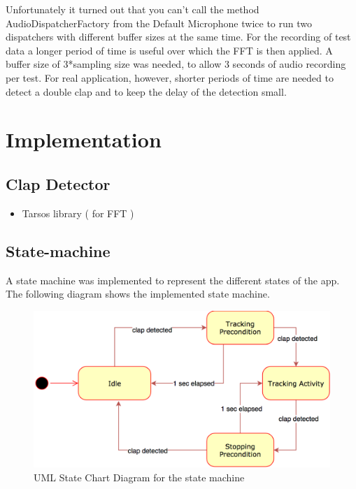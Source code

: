 Unfortunately it turned out that you can't call the method
AudioDispatcherFactory from the Default Microphone twice to run two dispatchers with
different buffer sizes at the same time. For the recording of test data a longer
period of time is useful over which the FFT is then applied. A buffer size of
3*sampling size was needed, to allow 3 seconds of audio recording per test. For
real application, however, shorter periods of time are needed to detect a double
clap and to keep the delay of the detection small.


\section{Implementation}
\label{sec:org7c927b3}
\subsection{Clap Detector}
\label{sec:orgaf5a63b}
\begin{itemize}
\item Tarsos library ( for FFT )
\end{itemize}
\subsection{State-machine}
\label{sec:orgd3a5b2d}
A state machine was implemented to represent the different states of the app.
The following diagram shows the implemented state machine.

\begin{figure}[H]
	\centering
	\includegraphics[width=1.0\linewidth]{./imgs/statemachine.png}
	\caption[Caption for LOF]{UML State Chart Diagram for the state machine}
	\label{statemachine}
\end{figure}

